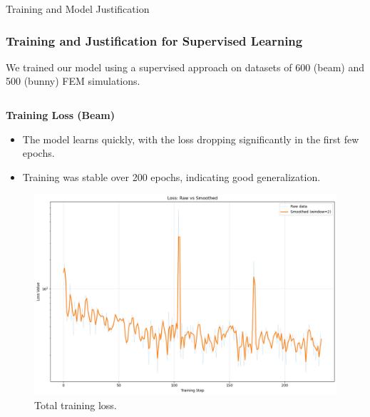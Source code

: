 \documentclass{beamer}
\begin{document}
\begin{frame}{Training and Model Justification}
    \frametitle{Training and Justification for Supervised Learning}
    
    We trained our model using a supervised approach on datasets of 600 (beam) and 500 (bunny) FEM simulations.
    
    \begin{columns}[T]
        \begin{column}{0.5\textwidth}
            \textbf{Training Loss (Beam)}
            \begin{itemize}
                \item The model learns quickly, with the loss dropping significantly in the first few epochs.
                \item Training was stable over 200 epochs, indicating good generalization.
            \end{itemize}
            \begin{figure}
                \includegraphics[width=\textwidth]{Images/training_loss_smoothed_logy.png}
                \caption{Total training loss.}
            \end{figure}
        \end{column}
        

\end{columns}
\end{frame}
\end{document}
